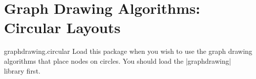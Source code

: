 %
%
%

\section{Graph Drawing Algorithms: Circular Layouts}


\begin{tikzlibrary}{graphdrawing.circular}
  Load this package when you wish to use the graph drawing algorithms
  that place nodes on circles. You should load the |graphdrawing| library first.
\end{tikzlibrary}


